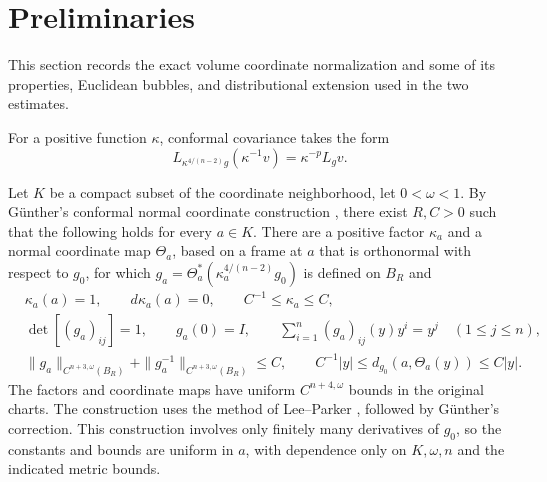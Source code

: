 \documentclass[11pt]{article}
\numberwithin{equation}{section}
\theoremstyle{remark}
\begin{document}
\section{Preliminaries}\label{sec:preliminaries}
\label{sec:common-preliminaries}

{
This section records the exact volume coordinate normalization and some of its properties, Euclidean bubbles, and distributional extension used in the two
estimates.

For a positive function \(\kappa\), conformal covariance takes the form
\[
 L_{\kappa^{4/(n-2)}g}(\kappa^{-1}v)=\kappa^{-p}L_gv.
\]
}

 Let \(K\) be a compact subset of the coordinate neighborhood,
 let \(0<\omega<1\). By G\"unther's
conformal normal coordinate construction \cite[Section  3]{Gunther}, there
exist \(R,C>0\) such that the following holds for every \(a\in K\). There
are a positive factor \(\kappa_a\) and a normal coordinate map \(\Theta_a\),
based on a frame at \(a\) that is orthonormal with respect to \(g_0\), for which
\(g_a=\Theta_a^*(\kappa_a^{4/(n-2)}g_0)\) is defined on \(B_R\) and
\begin{equation}\label{eq:conformal-normal-gauge}
\begin{aligned}
 &\kappa_a(a)=1,\qquad d\kappa_a(a)=0,
   \qquad C^{-1}\le\kappa_a\le C,\\
 &\det [(g_a)_{ij}] =1,\qquad g_a(0)=I,\qquad
   \sum_{i=1}^n(g_a)_{ij}(y)y^i=y^j\quad(1\le j\le n),\\
 &\|g_a\|_{C^{n+3,\omega}(B_R)}
   +\|g_a^{-1}\|_{C^{n+3,\omega}(B_R)}\le C,\qquad
 C^{-1}|y|\le d_{g_0}(a,\Theta_a(y))\le C|y|.
\end{aligned}
\end{equation}
The factors and coordinate maps have uniform \(C^{n+4,\omega}\) bounds in
the original charts. The construction uses the method of
Lee--Parker \cite[Theorem  5.1 and its proof]{LeeParker}, followed by
G\"unther's correction. This construction involves only finitely many derivatives of
\(g_0\), so the constants and bounds are uniform in \(a\), with dependence
only on \(K,\omega,n\) and the indicated metric bounds.
\end{document}
